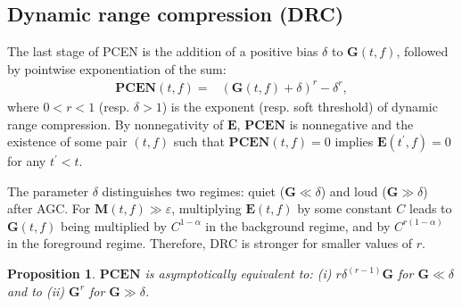 \documentclass[journal]{IEEEtran}
\makeatletter
\newcommand*{\resp}{resp.\@\xspace}
\newtheorem{prop}[thm]{Proposition}
\theoremstyle{remark}
\makeatother
\begin{document}
\subsection{Dynamic range compression (DRC)}
The last stage of PCEN is the addition of a positive bias $\delta$ to $\mathbf{G}(t,f)$, followed by pointwise exponentiation of the sum:
\begin{align}
\mathbf{PCEN}(t,f) = &
(\mathbf{G}(t,f) + \delta)^r - \delta^r,
\end{align}
where $0 < r < 1$ (\resp{} $\delta > 1$) is the exponent (\resp{} soft threshold) of dynamic range compression.
By nonnegativity of $\mathbf{E}$, $\mathbf{PCEN}$ is nonnegative and the existence of some pair $(t,f)$ such that $\mathbf{PCEN}(t,f)=0$ implies $\mathbf{E}(t^\prime,f) = 0$ for any $t^\prime < t$.

The parameter $\delta$ distinguishes two regimes: quiet ($\mathbf{G}\ll\delta$) and loud ($\mathbf{G}\gg\delta$) after AGC.
For $\mathbf{M}(t,f)\gg\varepsilon$, multiplying $\mathbf{E}(t,f)$ by some constant $C$ leads to $\mathbf{G}(t,f)$ being multiplied by $C^{1-\alpha}$ in the background regime, and by $C^{r(1-\alpha)}$ in the foreground regime.
Therefore, DRC is stronger for smaller values of $r$.

\begin{prop}
$\mathbf{PCEN}$ is asymptotically equivalent to: (i) $r \delta^{(r-1)} \mathbf{G}$ for $\mathbf{G} \ll \delta$ and to (ii) $\mathbf{G}^r$ for $\mathbf{G} \gg \delta$.
\label{prop:loudness-compression}
\end{prop}
\end{document}
